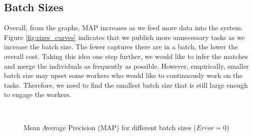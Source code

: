 \subsection{Batch Sizes} %
\label{sub:batch_sizes_res}

Overall, from the graphs, MAP increases as we feed more data into the system.
Figure \ref{fig:sizes_curves} indicates that we publish more unnecessary
tasks as we increase the batch size. The fewer captures there are in a batch,
the lower the overall cost. Taking this idea one step further, we would like to
infer the matches and merge the individuals as frequently as possible. However,
empirically, smaller batch size may upset some workers who would like to
continuously work on the tasks. Therefore, we need to find the smallest batch
size that is still large enough to engage the workers.

\begin{figure}[h!]
  \centering
  \\
  \captionsetup{justification=centering}
  \caption{Mean Average Precision (MAP) for different batch sizes ($Error=0$)}
\end{figure}

